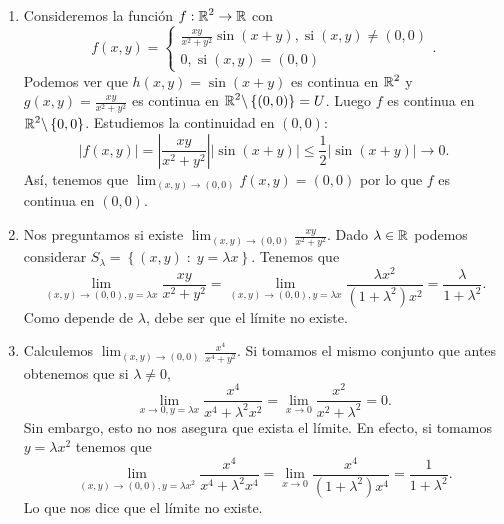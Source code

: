 \begin{eg}
\begin{enumerate}
\item Consideremos la función $\displaystyle f : \mathbb{R}^{2} \to \mathbb{R} $ con 
	\[f\left(x,y\right) = 
	\begin{cases}
	\frac{xy}{x^{2}+y^{2}}\sin\left(x+y\right), \; \text{si} \; \left(x,y\right) \neq \left(0,0\right) \\
	0, \; \text{si}\; \left(x,y\right) = \left(0,0\right)
	\end{cases}
	.\]
	Podemos ver que $\displaystyle h\left(x,y\right) = \sin\left(x+y\right) $ es continua en $\displaystyle \mathbb{R}^{2} $ y $\displaystyle g\left(x,y\right) = \frac{xy}{x^{2}+y^{2}} $ es continua en $\displaystyle \mathbb{R}^{2}\backslash \left\{ \left(0,0\right)\right\} = U $. Luego $\displaystyle f $ es continua en $\displaystyle \mathbb{R}^{2}\backslash \left\{ 0,0\right\}  $. Estudiemos la continuidad en $\displaystyle \left(0,0\right) $:
\[ \left|f\left(x,y\right)\right| = \left|\frac{xy}{x^{2}+y^{2}}\right| \left|\sin\left(x+y\right)\right| \leq \frac{1}{2} \left|\sin\left(x+y\right)\right| \to 0 .\]
Así, tenemos que $\displaystyle \lim_{\left(x,y\right) \to \left(0,0\right)}f\left(x,y\right) = \left(0,0\right) $ por lo que $\displaystyle f $ es continua en $\displaystyle \left(0,0\right) $. 
\item Nos preguntamos si existe $\displaystyle \lim_{\left(x,y\right) \to \left(0,0\right)}\frac{xy}{x^{2}+y^{2}} $. Dado $\displaystyle \lambda \in \mathbb{R} $ podemos considerar $\displaystyle S_{\lambda } = \left\{ \left(x,y\right) \; : \; y = \lambda x\right\}  $. Tenemos que
	\[\lim_{\left(x,y\right) \to \left(0,0\right), y = \lambda x}\frac{xy}{x^{2}+y^{2}} = \lim_{\left(x,y\right) \to \left(0,0\right), y = \lambda x} \frac{\lambda x^{2}}{\left(1+\lambda ^{2}\right)x^{2}} = \frac{\lambda }{1 + \lambda^{2}}.\]
Como depende de $\displaystyle \lambda  $, debe ser que el límite no existe. 
\item Calculemos $\displaystyle \lim_{\left(x,y\right) \to \left(0,0\right)}\frac{x^{4}}{x^{4}+y^{2}} $. Si tomamos el mismo conjunto que antes obtenemos que si $\displaystyle \lambda \neq 0 $,
	\[\lim_{x \to 0, y = \lambda x}\frac{x^{4}}{x^{4}+\lambda ^{2}x^{2}} = \lim_{x \to 0}\frac{x^{2}}{x^{2}+\lambda ^{2}} = 0 .\]
Sin embargo, esto no nos asegura que exista el límite. En efecto, si tomamos $\displaystyle y = \lambda x^{2} $ tenemos que
\[\lim_{\left(x,y\right) \to \left(0,0\right), y = \lambda x^{2}}\frac{x^{4}}{x^{4}+\lambda ^{2}x^{4}} = \lim_{x \to 0}\frac{x^{4}}{\left(1+\lambda ^{2}\right)x^{4}} = \frac{1}{1 + \lambda^{2}} .\]
Lo que nos dice que el límite no existe. 
\end{enumerate}
\end{eg}
